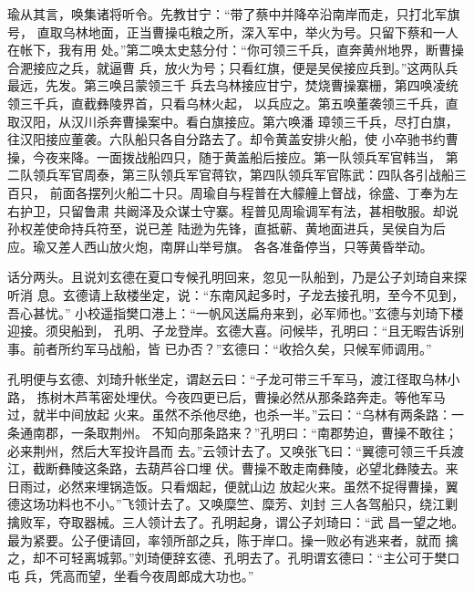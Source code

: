 瑜从其言，唤集诸将听令。先教甘宁：“带了蔡中并降卒沿南岸而走，只打北军旗号，
直取乌林地面，正当曹操屯粮之所，深入军中，举火为号。只留下蔡和一人在帐下，我有用
处。”第二唤太史慈分付：“你可领三千兵，直奔黄州地界，断曹操合淝接应之兵，就逼曹
兵，放火为号；只看红旗，便是吴侯接应兵到。”这两队兵最远，先发。第三唤吕蒙领三千
兵去乌林接应甘宁，焚烧曹操寨栅，第四唤凌统领三千兵，直截彝陵界首，只看乌林火起，
以兵应之。第五唤董袭领三千兵，直取汉阳，从汉川杀奔曹操案中。看白旗接应。第六唤潘
璋领三千兵，尽打白旗，往汉阳接应董袭。六队船只各自分路去了。却令黄盖安排火船，使
小卒驰书约曹操，今夜来降。一面拨战船四只，随于黄盖船后接应。第一队领兵军官韩当，
第二队领兵军官周泰，第三队领兵军官蒋钦，第四队领兵军官陈武：四队各引战船三百只，
前面各摆列火船二十只。周瑜自与程普在大艨艟上督战，徐盛、丁奉为左右护卫，只留鲁肃
共阚泽及众谋士守寨。程普见周瑜调军有法，甚相敬服。却说孙权差使命持兵符至，说已差
陆逊为先锋，直抵蕲、黄地面进兵，吴侯自为后应。瑜又差人西山放火炮，南屏山举号旗。
各各准备停当，只等黄昏举动。

话分两头。且说刘玄德在夏口专候孔明回来，忽见一队船到，乃是公子刘琦自来探听消
息。玄德请上敌楼坐定，说：“东南风起多时，子龙去接孔明，至今不见到，吾心甚忧。”
小校遥指樊口港上：“一帆风送扁舟来到，必军师也。”玄德与刘琦下楼迎接。须臾船到，
孔明、子龙登岸。玄德大喜。问候毕，孔明曰：“且无暇告诉别事。前者所约军马战船，皆
已办否？”玄德曰：“收拾久矣，只候军师调用。”

孔明便与玄德、刘琦升帐坐定，谓赵云曰：“子龙可带三千军马，渡江径取乌林小路，
拣树木芦苇密处埋伏。今夜四更已后，曹操必然从那条路奔走。等他军马过，就半中间放起
火来。虽然不杀他尽绝，也杀一半。”云曰：“乌林有两条路：一条通南郡，一条取荆州。
不知向那条路来？”孔明曰：“南郡势迫，曹操不敢往；必来荆州，然后大军投许昌而
去。”云领计去了。又唤张飞曰：“翼德可领三千兵渡江，截断彝陵这条路，去葫芦谷口埋
伏。曹操不敢走南彝陵，必望北彝陵去。来日雨过，必然来埋锅造饭。只看烟起，便就山边
放起火来。虽然不捉得曹操，翼德这场功料也不小。”飞领计去了。又唤糜竺、糜芳、刘封
三人各驾船只，绕江剿擒败军，夺取器械。三人领计去了。孔明起身，谓公子刘琦曰：“武
昌一望之地。最为紧要。公子便请回，率领所部之兵，陈于岸口。操一败必有逃来者，就而
擒之，却不可轻离城郭。”刘琦便辞玄德、孔明去了。孔明谓玄德曰：“主公可于樊口屯
兵，凭高而望，坐看今夜周郎成大功也。”

